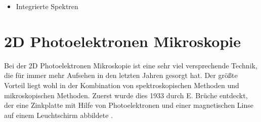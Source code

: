         \begin{itemize}
            \item Integrierte Spektren
        \end{itemize}


    \section{2D Photoelektronen Mikroskopie} \label{sec:2D-PES}
        Bei der 2D Photoelektronen Mikroskopie ist eine sehr viel versprechende Technik, die für immer mehr Aufsehen in den letzten Jahren gesorgt hat.
        Der größte Vorteil liegt wohl in der Kombination von spektroskopischen Methoden und mikroskopischen Methoden.
        Zuerst wurde dies 1933 durch E. Brüche entdeckt, der eine Zinkplatte mit Hilfe von Photoelektronen und einer magnetischen Linse auf einem Leuchtschirm abbildete \cite{bruche_elektronenmikroskopische_1933}.

